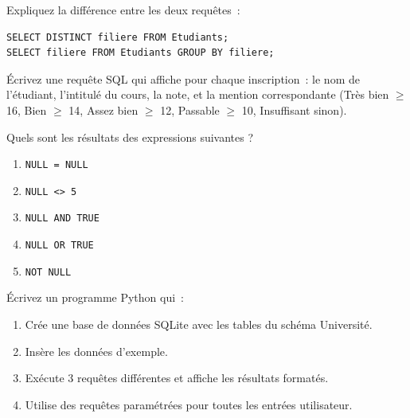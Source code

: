 \begin{exercice}
Expliquez la diff\'erence entre les deux requ\^etes~:
\begin{verbatim}
SELECT DISTINCT filiere FROM Etudiants;
SELECT filiere FROM Etudiants GROUP BY filiere;
\end{verbatim}
\end{exercice}

\begin{exercice}
\'Ecrivez une requ\^ete SQL qui affiche pour chaque inscription~: le nom
de l'\'etudiant, l'intitul\'e du cours, la note, et la mention correspondante
(Tr\`es bien $\geq$ 16, Bien $\geq$ 14, Assez bien $\geq$ 12, Passable $\geq$ 10,
Insuffisant sinon).
\end{exercice}

\begin{exercice}
Quels sont les r\'esultats des expressions suivantes ?
\begin{enumerate}
    \item \texttt{NULL = NULL}
    \item \texttt{NULL <> 5}
    \item \texttt{NULL AND TRUE}
    \item \texttt{NULL OR TRUE}
    \item \texttt{NOT NULL}
\end{enumerate}
\end{exercice}

\begin{exercice}
\'Ecrivez un programme Python qui~:
\begin{enumerate}
    \item Cr\'ee une base de donn\'ees SQLite avec les tables du sch\'ema Universit\'e.
    \item Ins\`ere les donn\'ees d'exemple.
    \item Ex\'ecute 3 requ\^etes diff\'erentes et affiche les r\'esultats format\'es.
    \item Utilise des requ\^etes param\'etr\'ees pour toutes les entr\'ees utilisateur.
\end{enumerate}
\end{exercice}
